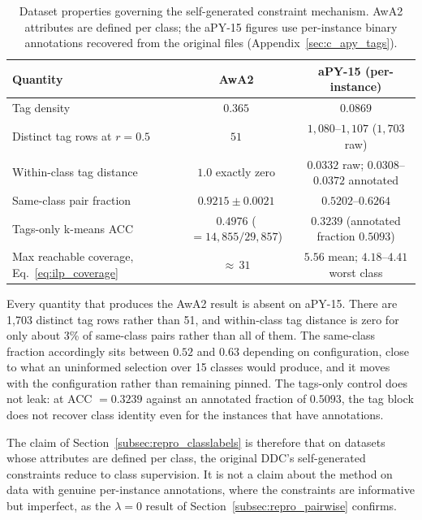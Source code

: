 \begin{table}[H]
    \centering
    \footnotesize
    \caption[Dataset characterisation underlying the constraint finding]{Dataset properties governing the self-generated constraint mechanism. AwA2 attributes are defined per class; the aPY-15 figures use per-instance binary annotations recovered from the original files (Appendix~\ref{sec:c_apy_tags}).}
    \label{tab:repro_datasets}
    \begin{tabular}{lcc}
        \hline
        \textbf{Quantity} & \textbf{AwA2} & \textbf{aPY-15 (per-instance)} \\
        \hline
        Tag density & $0.365$ & $0.0869$ \\
        Distinct tag rows at $r = 0.5$ & $51$ & $1{,}080$--$1{,}107$ ($1{,}703$ raw) \\
        Within-class tag distance & $1.0$ exactly zero & $0.0332$ raw; $0.0308$--$0.0372$ annotated \\
        Same-class pair fraction & $0.9215 \pm 0.0021$ & $0.5202$--$0.6264$ \\
        Tags-only k-means ACC & $0.4976$ ($= 14{,}855/29{,}857$) & $0.3239$ (annotated fraction $0.5093$) \\
        Max reachable coverage, Eq.~\ref{eq:ilp_coverage} & ${\approx}\,31$ & $5.56$ mean; $4.18$--$4.41$ worst class \\
        \hline
    \end{tabular}
\end{table}


Every quantity that produces the AwA2 result is absent on aPY-15. There are 1,703 distinct tag rows rather than 51, and within-class tag distance is zero for only about 3\% of same-class pairs rather than all of them. The same-class fraction accordingly sits between $0.52$ and $0.63$ depending on configuration, close to what an uninformed selection over 15 classes would produce, and it moves with the configuration rather than remaining pinned. The tags-only control does not leak: at ACC $= 0.3239$ against an annotated fraction of $0.5093$, the tag block does not recover class identity even for the instances that have annotations.

The claim of Section~\ref{subsec:repro_classlabels} is therefore that on datasets whose attributes are defined per class, the original DDC's self-generated constraints reduce to class supervision. It is not a claim about the method on data with genuine per-instance annotations, where the constraints are informative but imperfect, as the $\lambda = 0$ result of Section~\ref{subsec:repro_pairwise} confirms.

